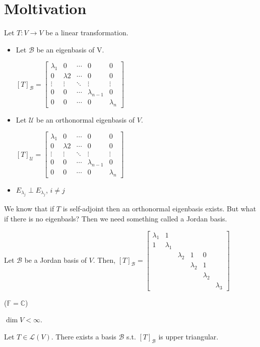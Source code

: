 \documentclass[11pt,fleqn]{book} %
\begin{document}
\setcounter{section}{-1}
\section{Moltivation}

Let $T: V \to V$ be a linear transformation.

\begin{itemize}
    \item Let $\mathcal{B}$ be an eigenbasis of V.

    $[T]_\mathcal{B} = \begin{bmatrix} \lambda_1 &0 &\cdots &0 &0 \\ 0 &\lambda 2 &\cdots &0 &0 \\ \vdots &\vdots &\ddots &\vdots &\vdots \\ 0 &0 &\cdots &\lambda_{n-1} &0 \\ 0 &0 &\cdots &0 &\lambda_n \end{bmatrix}$

    \item Let $\mathcal{U}$ be an orthonormal eigenbasis of $V$.

    $[T]_\mathcal{U} = \begin{bmatrix} \lambda_1 &0 &\cdots &0 &0 \\ 0 &\lambda 2 &\cdots &0 &0 \\ \vdots &\vdots &\ddots &\vdots &\vdots \\ 0 &0 &\cdots &\lambda_{n-1} &0 \\ 0 &0 &\cdots &0 &\lambda_n \end{bmatrix}$

    \item $E_{\lambda_j} \perp E_{\lambda_j}$, $i \neq j$
\end{itemize}

We know that if $T$ is self-adjoint then an orthonormal eigenbasis exists. But what if there is no eigenbasls? Then we need something called a Jordan basis.

Let $\mathcal{B}$ be a Jordan basis of $V$. Then, $[T]_\mathcal{B} = \begin{bmatrix}  \lambda_1 &1 \\ 1 &\lambda_1 \\ & &\lambda_2 &1 &0 \\ & & &\lambda_2 &1 \\ & & & &\lambda_2 \\ & & & & &\lambda_3 \end{bmatrix}$

\begin{theorem}
    ($\mathbb{F} = \mathbb{C}$)

    $\dim V < \infty$.

    Let $T \in \mathcal{L}(V)$. There exists a basis $\mathcal{B}$ s.t. $[T]_\mathcal{B}$ is upper triangular.
\end{theorem}
\end{document}

